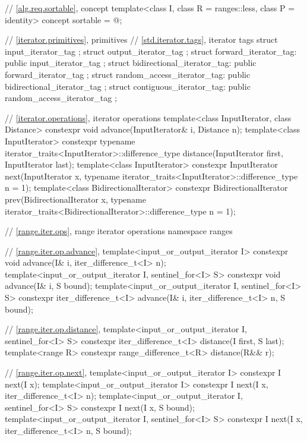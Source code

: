 \begin{codeblock}
{  // \ref{alg.req.sortable}, concept 
  template<class I, class R = ranges::less, class P = identity>
    concept sortable = @\seebelow@;

  // \ref{iterator.primitives}, primitives
  // \ref{std.iterator.tags}, iterator tags
  struct input_iterator_tag { };
  struct output_iterator_tag { };
  struct forward_iterator_tag: public input_iterator_tag { };
  struct bidirectional_iterator_tag: public forward_iterator_tag { };
  struct random_access_iterator_tag: public bidirectional_iterator_tag { };
  struct contiguous_iterator_tag: public random_access_iterator_tag { };

  // \ref{iterator.operations}, iterator operations
  template<class InputIterator, class Distance>
    constexpr void
      advance(InputIterator& i, Distance n);
  template<class InputIterator>
    constexpr typename iterator_traits<InputIterator>::difference_type
      distance(InputIterator first, InputIterator last);
  template<class InputIterator>
    constexpr InputIterator
      next(InputIterator x,
           typename iterator_traits<InputIterator>::difference_type n = 1);
  template<class BidirectionalIterator>
    constexpr BidirectionalIterator
      prev(BidirectionalIterator x,
           typename iterator_traits<BidirectionalIterator>::difference_type n = 1);

  // \ref{range.iter.ops}, range iterator operations
  namespace ranges {
    // \ref{range.iter.op.advance}, 
    template<input_or_output_iterator I>
      constexpr void advance(I& i, iter_difference_t<I> n);
    template<input_or_output_iterator I, sentinel_for<I> S>
      constexpr void advance(I& i, S bound);
    template<input_or_output_iterator I, sentinel_for<I> S>
      constexpr iter_difference_t<I> advance(I& i, iter_difference_t<I> n, S bound);

    // \ref{range.iter.op.distance}, 
    template<input_or_output_iterator I, sentinel_for<I> S>
      constexpr iter_difference_t<I> distance(I first, S last);
    template<range R>
      constexpr range_difference_t<R> distance(R&& r);

    // \ref{range.iter.op.next}, 
    template<input_or_output_iterator I>
      constexpr I next(I x);
    template<input_or_output_iterator I>
      constexpr I next(I x, iter_difference_t<I> n);
    template<input_or_output_iterator I, sentinel_for<I> S>
      constexpr I next(I x, S bound);
    template<input_or_output_iterator I, sentinel_for<I> S>
      constexpr I next(I x, iter_difference_t<I> n, S bound);

}}
\end{codeblock}
